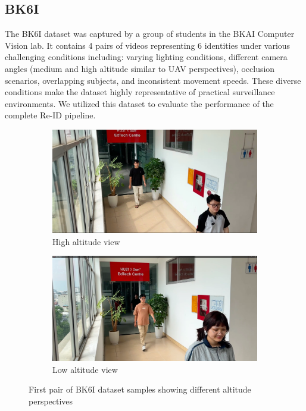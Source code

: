 \subsection{BK6I}

The BK6I dataset was captured by a group of students in the BKAI Computer Vision lab. It contains 4 pairs of videos representing 6 identities under various challenging conditions including: varying lighting conditions, different camera angles (medium and high altitude similar to UAV perspectives), occlusion scenarios, overlapping subjects, and inconsistent movement speeds. These diverse conditions make the dataset highly representative of practical surveillance environments. We utilized this dataset to evaluate the performance of the complete Re-ID pipeline.

\begin{figure}[htbp]
    \centering
    \begin{subfigure}[b]{0.48\textwidth}
        \centering
        \includegraphics[width=\textwidth]{Figure/edtech_high.png}
        \caption{High altitude view}
        \label{fig:edtech_high1}
    \end{subfigure}
    \hfill
    \begin{subfigure}[b]{0.48\textwidth}
        \centering
        \includegraphics[width=\textwidth]{Figure/edtech_low.png}
        \caption{Low altitude view}
        \label{fig:edtech_low1}
    \end{subfigure}
    \caption{First pair of BK6I dataset samples showing different altitude perspectives}
    \label{fig:bk6i_pair1}
\end{figure}

